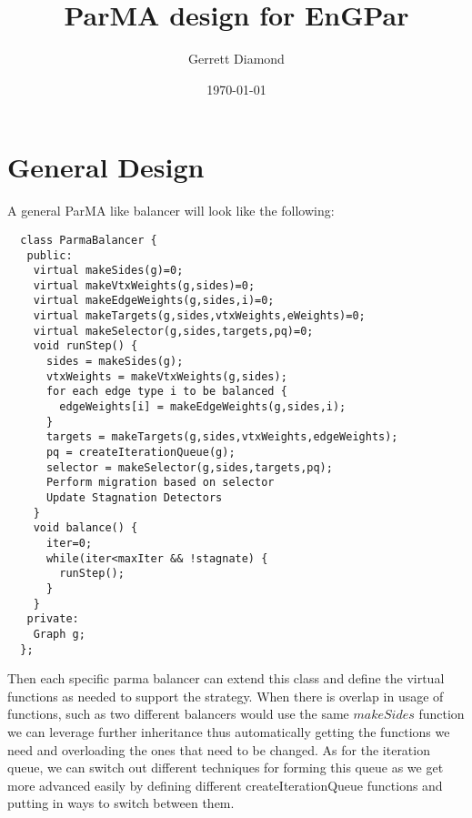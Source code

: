 \documentclass[a4paper]{article}
\title{ParMA design for EnGPar}
\author{Gerrett Diamond}
\date{\today}
\begin{document}
\maketitle
{}



\section{General Design}
A general ParMA like balancer will look like the following:

\begin{lstlisting}
  class ParmaBalancer {
   public:
    virtual makeSides(g)=0;
    virtual makeVtxWeights(g,sides)=0;
    virtual makeEdgeWeights(g,sides,i)=0;
    virtual makeTargets(g,sides,vtxWeights,eWeights)=0;
    virtual makeSelector(g,sides,targets,pq)=0;
    void runStep() {
      sides = makeSides(g);
      vtxWeights = makeVtxWeights(g,sides);
      for each edge type i to be balanced {
        edgeWeights[i] = makeEdgeWeights(g,sides,i);
      }
      targets = makeTargets(g,sides,vtxWeights,edgeWeights);
      pq = createIterationQueue(g);
      selector = makeSelector(g,sides,targets,pq);
      Perform migration based on selector
      Update Stagnation Detectors
    }
    void balance() {
      iter=0;
      while(iter<maxIter && !stagnate) {
        runStep();
      }
    }
   private:
    Graph g;
  };
\end{lstlisting}

Then each specific parma balancer can extend this class and define the virtual functions as needed to support the strategy. When there is overlap in usage of functions, such as two different balancers would use the same $makeSides$ function we can leverage further inheritance thus automatically getting the functions we need and overloading the ones that need to be changed. As for the iteration queue, we can switch out different techniques for forming this queue as we get more advanced easily by defining different createIterationQueue functions and putting in ways to switch between them.
\end{document}
